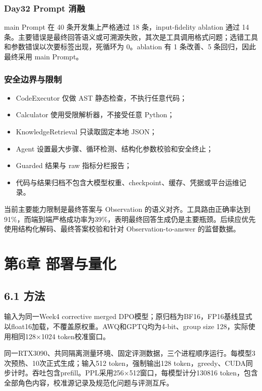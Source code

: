 \documentclass[UTF8,fontset=fandol,a4paper,11pt]{ctexart}
\providecommand{\tightlist}{\setlength{\itemsep}{0pt}\setlength{\parskip}{0pt}}
\begin{document}
\subsubsection{Day32 Prompt 消融}\label{day32-prompt-ux6d88ux878d}

main Prompt 在 40 条开发集上严格通过 18 条，input-fidelity ablation 通过
14
条。主要错误是最终回答语义或可溯源失败，其次是工具调用格式问题；选错工具和参数错误以次要标签出现，死循环为
0。ablation 有 1 条改善、5 条回归，因此最终采用 main Prompt。

\subsubsection{安全边界与限制}\label{ux5b89ux5168ux8fb9ux754cux4e0eux9650ux5236}

\begin{itemize}
\tightlist
\item
  CodeExecutor 仅做 AST 静态检查，不执行任意代码；
\item
  Calculator 使用受限解析器，不接受任意 Python；
\item
  KnowledgeRetrieval 只读取固定本地 JSON；
\item
  Agent 设置最大步骤、循环检测、结构化参数校验和安全终止；
\item
  Guarded 结果与 raw 指标分栏报告；
\item
  代码与结果归档不包含大模型权重、checkpoint、缓存、凭据或平台运维记录。
\end{itemize}

当前主要能力限制是最终答案与 Observation
的语义对齐。工具路由正确率达到91\%，而端到端严格成功率为39\%，表明最终回答生成仍是主要瓶颈。后续应优先使用结构化解码、最终答案校验和针对
Observation-to-answer 的监督数据。

\section{第6章
部署与量化}\label{ux7b2c6ux7ae0-ux90e8ux7f72ux4e0eux91cfux5316}

\subsection{6.1 方法}\label{ux65b9ux6cd5}

输入为同一Week4 corrective merged
DPO模型；原归档为BF16，FP16基线显式以float16加载，不覆盖原权重。AWQ和GPTQ均为4-bit、group
size 128，实际使用相同128×1024 token校准窗口。

同一RTX3090、共同隔离测量环境、固定评测数据，三个进程顺序运行。每模型3次预热、10次正式生成；输入512
token，强制输出128
token，greedy、CUDA同步计时。吞吐包含prefill。PPL采用256×512窗口，每模型计分130816
token，包含全部角色内容，校准源记录及规范化问题与评测互斥。
\end{document}
